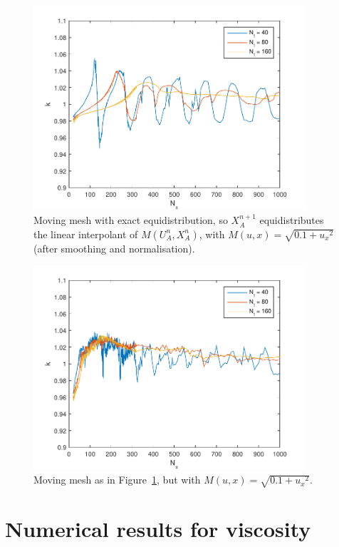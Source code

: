 \documentclass{article}
\begin{document}
\begin{figure}[htbp]
\centering
  \includegraphics[width=0.9\textwidth]{alan4-k.pdf}
  \caption{Moving mesh with exact equidistribution, so $X_A^{n+1}$
    equidistributes the linear interpolant of $M(U^n_A,X^n_A)$, with
    $M(u,x) = \sqrt{0.1 + {u_x}^2}$ (after smoothing and normalisation).
  \label{fig:alan4-k}}
\end{figure}
\begin{figure}[hbtp]
\centering
  \includegraphics[width=0.9\textwidth]{alan7-k.pdf}
  \caption{Moving mesh as in Figure~\ref{fig:alan4-k}, but with
  $M(u,x) = \sqrt{0.1 + {u_x}^2}$.
  \label{fig:alan7-k}}
\end{figure}

\clearpage
\section{Numerical results for viscosity}
\end{document}
